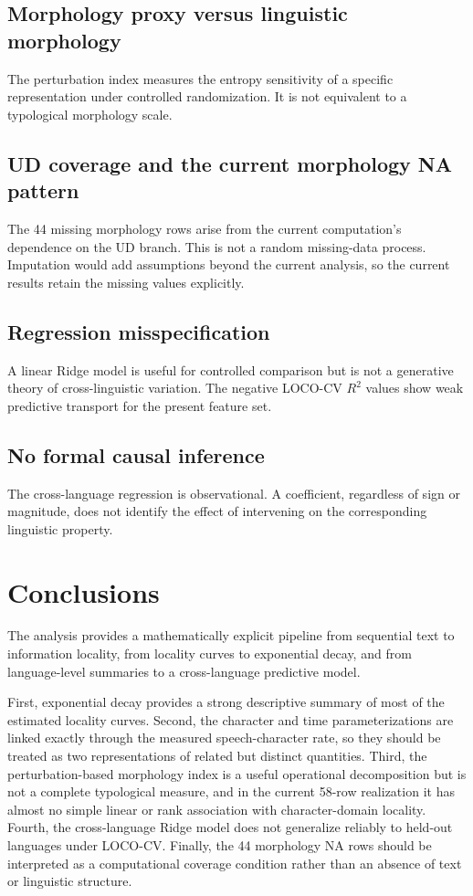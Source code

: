 \documentclass[11pt]{article}
\begin{document}
\subsection{Morphology proxy versus linguistic morphology}
The perturbation index measures the entropy sensitivity of a specific representation under controlled randomization. It is not equivalent to a typological morphology scale.

\subsection{UD coverage and the current morphology NA pattern}
The 44 missing morphology rows arise from the current computation's dependence on the UD branch. This is not a random missing-data process. Imputation would add assumptions beyond the current analysis, so the current results retain the missing values explicitly.

\subsection{Regression misspecification}
A linear Ridge model is useful for controlled comparison but is not a generative theory of cross-linguistic variation. The negative LOCO-CV $R^2$ values show weak predictive transport for the present feature set.

\subsection{No formal causal inference}
The cross-language regression is observational. A coefficient, regardless of sign or magnitude, does not identify the effect of intervening on the corresponding linguistic property.

\section{Conclusions}
The analysis provides a mathematically explicit pipeline from sequential text to information locality, from locality curves to exponential decay, and from language-level summaries to a cross-language predictive model.

First, exponential decay provides a strong descriptive summary of most of the estimated locality curves. Second, the character and time parameterizations are linked exactly through the measured speech-character rate, so they should be treated as two representations of related but distinct quantities. Third, the perturbation-based morphology index is a useful operational decomposition but is not a complete typological measure, and in the current 58-row realization it has almost no simple linear or rank association with character-domain locality. Fourth, the cross-language Ridge model does not generalize reliably to held-out languages under LOCO-CV. Finally, the 44 morphology NA rows should be interpreted as a computational coverage condition rather than an absence of text or linguistic structure.
\end{document}
